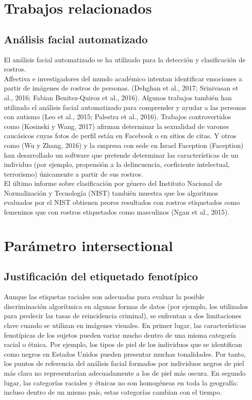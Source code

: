 \section{Trabajos relacionados}
\subsection{Análisis facial automatizado}
El análisis facial automatizado se ha utilizado para la detección y clasificación de rostros.\\

Affectiva e investigadores del mundo académico intentan identificar emociones a partir de imágenes de rostros de personas. (Dehghan et al., 2017; Srinivasan et al., 2016; Fabian Benitez-Quiroz et al., 2016). Algunos trabajos también han utilizado el análisis facial automatizado para comprender y ayudar a las personas con autismo (Leo et al., 2015; Palestra et al., 2016). Trabajos controvertidos como (Kosinski y Wang, 2017) afirman determinar la sexualidad de varones caucásicos cuyas fotos de perfil están en Facebook o en sitios de citas. Y otros como (Wu y Zhang, 2016) y la empresa con sede en Israel Faception (Faception) han desarrollado un software que pretende determinar las características de un individuo (por ejemplo, propensión a la delincuencia, coeficiente intelectual, terrorismo) únicamente a partir de sus rostros. \\

El último informe sobre clasificación por género del Instituto Nacional de Normalización y Tecnología (NIST) también muestra que los algoritmos evaluados por el NIST obtienen peores resultados con rostros etiquetados como femeninos que con rostros etiquetados como masculinos (Ngan et al., 2015).

\section{Parámetro intersectional}
\subsection{Justificación del etiquetado fenotípico}
Aunque las etiquetas raciales son adecuadas para evaluar la posible discriminación algorítmica en algunas formas de datos (por ejemplo, los utilizados para predecir las tasas de reincidencia criminal), se enfrentan a dos limitaciones clave cuando se utilizan en imágenes visuales. En primer lugar, las características fenotípicas de los sujetos pueden variar mucho dentro de una misma categoría racial o étnica. Por ejemplo, los tipos de piel de los individuos que se identifican como negros en Estados Unidos pueden presentar muchas tonalidades. Por tanto, los puntos de referencia del análisis facial formados por individuos negros de piel más clara no representarían adecuadamente a los de piel más oscura. En segundo lugar, las categorías raciales y étnicas no son homogéneas en toda la geografía: incluso dentro de un mismo país, estas categorías cambian con el tiempo.\\

